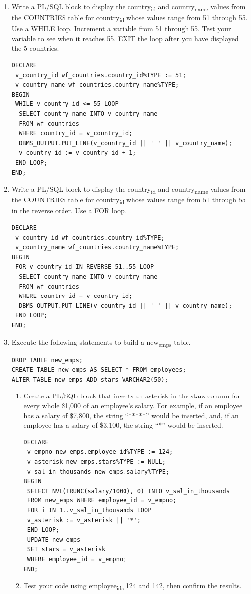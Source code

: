 \documentclass[11pt]{article}
\begin{document}
\begin{enumerate}
\item Write a PL/SQL block to display the country\textsubscript{id} and country\textsubscript{name} values from the COUNTRIES table for country\textsubscript{id} whose values range from 51 through 55. Use a WHILE loop. Increment a variable from 51 through 55. Test your variable to see when it reaches 55. EXIT the loop after you have displayed the 5 countries.
\begin{verbatim}
DECLARE
 v_country_id wf_countries.country_id%TYPE := 51;
 v_country_name wf_countries.country_name%TYPE;
BEGIN
 WHILE v_country_id <= 55 LOOP
  SELECT country_name INTO v_country_name
  FROM wf_countries
  WHERE country_id = v_country_id;
  DBMS_OUTPUT.PUT_LINE(v_country_id || ' ' || v_country_name);
  v_country_id := v_country_id + 1;
 END LOOP;
END;
\end{verbatim}

\item Write a PL/SQL block to display the country\textsubscript{id} and country\textsubscript{name} values from the COUNTRIES table for country\textsubscript{id} whose values range from 51 through 55 in the reverse order. Use a FOR loop.
\begin{verbatim}
DECLARE
 v_country_id wf_countries.country_id%TYPE;
 v_country_name wf_countries.country_name%TYPE;
BEGIN
 FOR v_country_id IN REVERSE 51..55 LOOP
  SELECT country_name INTO v_country_name
  FROM wf_countries
  WHERE country_id = v_country_id;
  DBMS_OUTPUT.PUT_LINE(v_country_id || ' ' || v_country_name);
 END LOOP;
END;
\end{verbatim}

\item Execute the following statements to build a new\textsubscript{emps} table.
\begin{verbatim}
DROP TABLE new_emps;
CREATE TABLE new_emps AS SELECT * FROM employees;
ALTER TABLE new_emps ADD stars VARCHAR2(50);
\end{verbatim}
\begin{enumerate}
\item Create a PL/SQL block that inserts an asterisk in the stars column for every whole \$1,000 of an employee’s salary. For example, if an employee has a salary of \$7,800, the string “*****” would be inserted, and, if an employee has a salary of \$3,100, the string “*” would be inserted.
\begin{verbatim}
DECLARE
 v_empno new_emps.employee_id%TYPE := 124;
 v_asterisk new_emps.stars%TYPE := NULL;
 v_sal_in_thousands new_emps.salary%TYPE;
BEGIN
 SELECT NVL(TRUNC(salary/1000), 0) INTO v_sal_in_thousands
 FROM new_emps WHERE employee_id = v_empno;
 FOR i IN 1..v_sal_in_thousands LOOP
 v_asterisk := v_asterisk || '*';
 END LOOP;
 UPDATE new_emps
 SET stars = v_asterisk
 WHERE employee_id = v_empno;
END;
\end{verbatim}
\item Test your code using employee\textsubscript{ids} 124 and 142, then confirm the results.


\end{enumerate}
\end{enumerate}
\end{document}
